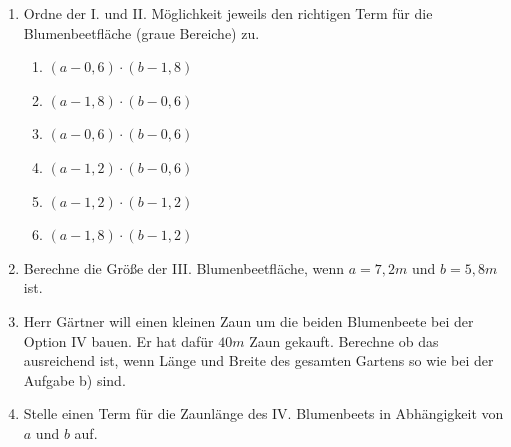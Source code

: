 \documentclass[a4paper,12pt]{article}
\newcommand{\Aufgabe}[1]{
  {
  \vspace*{0.5cm}
  \textsf{\textbf{Aufgabe #1}}
  \vspace*{0.2cm}
  
  }
}
\begin{document}
\begin{enumerate}[label={\alph*)}]
  \item Ordne der I. und II. Möglichkeit jeweils den richtigen Term für die Blumenbeetfläche (graue Bereiche) zu.


\begin{minipage}[t]{0.45\textwidth}
    \begin{enumerate}[label=\arabic*.]
    \item $(a-0,6)\cdot (b-1,8)$
    \item $(a-1,8)\cdot (b-0,6)$
    \item $(a-0,6)\cdot (b-0,6)$
  \end{enumerate}
\end{minipage}
\hspace*{0.15cm}
\begin{minipage}[t]{0.35\textwidth}
    \begin{enumerate}[label=\arabic*.]
    \setcounter{enumii}{3}
    \item $(a-1,2)\cdot (b-0,6)$
    \item $(a-1,2)\cdot (b-1,2)$
    \item $(a-1,8)\cdot (b-1,2)$
  \end{enumerate}
\end{minipage}
    \vspace{10mm}


  \item Berechne die Größe der III. Blumenbeetfläche, wenn $a=7,2m$ und $b=5,8m$ ist.
    \vspace{50mm}
  \item Herr Gärtner will einen kleinen Zaun um die beiden Blumenbeete bei der Option IV bauen. Er hat dafür $40m$ Zaun gekauft. Berechne ob das ausreichend ist, wenn Länge und Breite des gesamten Gartens so wie bei der Aufgabe b) sind.
    \vspace{50mm}
  \item Stelle einen Term für die Zaunlänge des IV. Blumenbeets in Abhängigkeit von $a$ und $b$ auf.
\end{enumerate}


\vspace{1cm}




\end{document}
